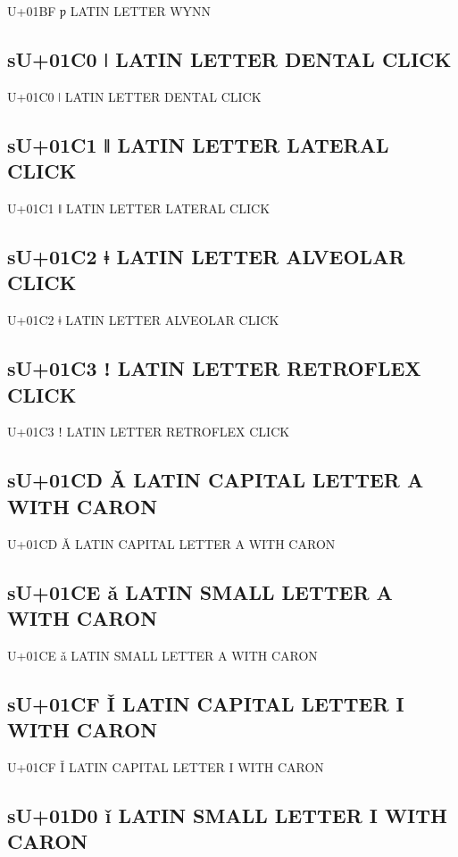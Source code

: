 U+01BF ƿ LATIN LETTER WYNN

\subsection{sU+01C0 ǀ LATIN LETTER DENTAL CLICK}

U+01C0 ǀ LATIN LETTER DENTAL CLICK

\subsection{sU+01C1 ǁ LATIN LETTER LATERAL CLICK}

U+01C1 ǁ LATIN LETTER LATERAL CLICK

\subsection{sU+01C2 ǂ LATIN LETTER ALVEOLAR CLICK}

U+01C2 ǂ LATIN LETTER ALVEOLAR CLICK

\subsection{sU+01C3 ǃ LATIN LETTER RETROFLEX CLICK}

U+01C3 ǃ LATIN LETTER RETROFLEX CLICK

\subsection{sU+01CD Ǎ  LATIN CAPITAL LETTER A WITH CARON}

U+01CD Ǎ  LATIN CAPITAL LETTER A WITH CARON

\subsection{sU+01CE ǎ  LATIN SMALL LETTER A WITH CARON}

U+01CE ǎ  LATIN SMALL LETTER A WITH CARON

\subsection{sU+01CF Ǐ  LATIN CAPITAL LETTER I WITH CARON}

U+01CF Ǐ  LATIN CAPITAL LETTER I WITH CARON

\subsection{sU+01D0 ǐ  LATIN SMALL LETTER I WITH CARON}

